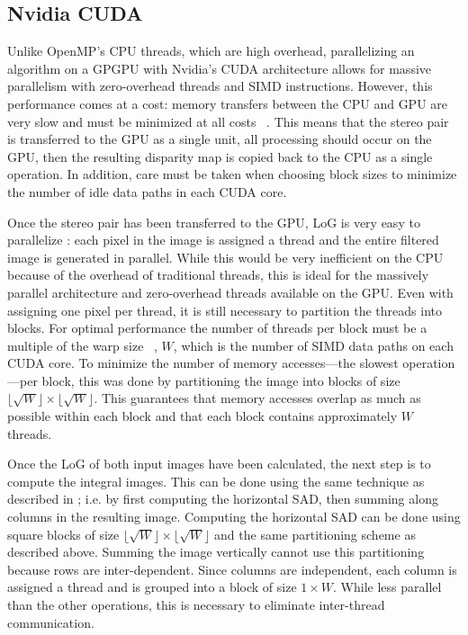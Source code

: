 \documentclass{article}
\newcommand{\floor}[1]{\lfloor#1\rfloor}
\begin{document}
\subsection{Nvidia CUDA}
\label{sec:parallel-cuda}
Unlike OpenMP's CPU threads, which are high overhead, parallelizing an
algorithm on a GPGPU with Nvidia's CUDA architecture allows for massive
parallelism with zero-overhead threads and SIMD instructions.  However, this
performance comes at a cost: memory transfers between the CPU and GPU are very
slow and must be minimized at all costs ~\cite{cuda}. This means that the
stereo pair is transferred to the GPU as a single unit, all processing should
occur on the GPU, then the resulting disparity map is copied back to the CPU as
a single operation. In addition, care must be taken when choosing block sizes
to minimize the number of idle data paths in each CUDA core.

Once the stereo pair has been transferred to the GPU, LoG is very easy to
parallelize : each pixel in the image is assigned a thread and the entire
filtered image is generated in parallel. While this would be very inefficient
on the CPU because of the overhead of traditional threads, this is ideal for
the massively parallel architecture and zero-overhead threads available on the
GPU. Even with assigning one pixel per thread, it is still necessary to
partition the threads into blocks. For optimal performance the number of
threads per block must be a multiple of the warp size ~\cite{cuda}, $W$, which
is the number of SIMD data paths on each CUDA core. To minimize the number of
memory accesses---the slowest operation---per block, this was done by
partitioning the image into blocks of size $\floor{\sqrt{W}} \times
\floor{\sqrt{W}}$. This guarantees that memory accesses overlap as much as possible within each block and that each block contains approximately $W$ threads.

Once the LoG of both input images have been calculated, the next step is to
compute the integral images. This can be done using the same technique as
described in ; i.e. by first computing the horizontal SAD, then
summing along columns in the resulting image. Computing the horizontal SAD can
be done using square blocks of size $\floor{\sqrt{W}} \times \floor{\sqrt{W}}$
and the same partitioning scheme as described above. Summing the image
vertically cannot use this partitioning because rows are inter-dependent. Since
columns are independent, each column is assigned a thread and is grouped into a
block of size $1 \times W$. While less parallel than the other operations, this
is necessary to eliminate inter-thread communication.
\end{document}
